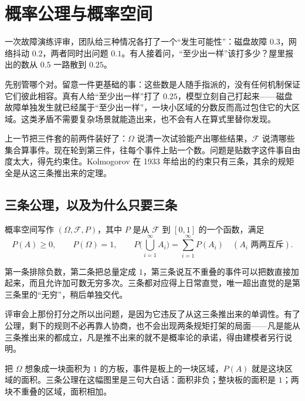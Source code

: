 \section{概率公理与概率空间}
\label{sec:05-Probability/01-Probability-Spaces/02}

一次故障演练评审，团队给三种情况各打了一个``发生可能性''：磁盘故障 \(0.3\)，网络抖动 \(0.2\)，两者同时出问题 \(0.1\)。有人接着问，``至少出一样''该打多少？屋里报出的数从 \(0.5\) 一路散到 \(0.25\)。

先别管哪个对。留意一件更基础的事：这些数是人随手指派的，没有任何机制保证它们彼此相容。真有人给``至少出一样''打了 \(0.25\)，模型立刻自己打起来——磁盘故障单独发生就已经属于``至少出一样''，一块小区域的分数反而高过包住它的大区域。这类矛盾不需要复杂场景就能造出来，也不会有人在算式里替你发现。

上一节把三件套的前两件装好了：\(\Omega\) 说清一次试验能产出哪些结果，\(\mathcal F\) 说清哪些集合算事件。现在轮到第三件，往每个事件上贴一个数。问题是贴数字这件事自由度太大，得先约束住。Kolmogorov 在 1933 年给出的约束只有三条，其余的规矩全是从这三条推出来的定理。

\subsection{三条公理，以及为什么只要三条}

概率空间写作 \((\Omega,\mathcal F,P)\)，其中 \(P\) 是从 \(\mathcal F\) 到 \([0,1]\) 的一个函数，满足
\[
P(A)\ge0,\qquad P(\Omega)=1,\qquad
P\Big(\bigcup_{i=1}^{\infty}A_i\Big)=\sum_{i=1}^{\infty}P(A_i)\quad(A_i\text{ 两两互斥}).
\]

第一条排除负数，第二条把总量定成 \(1\)，第三条说互不重叠的事件可以把数直接加起来，而且允许加可数无穷多次。三条都对应得上日常直觉，唯一超出直觉的是第三条里的``无穷''，稍后单独交代。

评审会上那份打分之所以出问题，是因为它违反了从这三条推出来的单调性。有了公理，剩下的规则不必再靠人协商，也不会出现两条规矩打架的局面——凡是能从三条推出来的都成立，凡是推不出来的就不是概率论的承诺，得由建模者另行说明。

把 \(\Omega\) 想象成一块面积为 \(1\) 的方板，事件是板上的一块区域，\(P(A)\) 就是这块区域的面积。三条公理在这幅图里是三句大白话：面积非负；整块板的面积是 \(1\)；两块不重叠的区域，面积相加。

